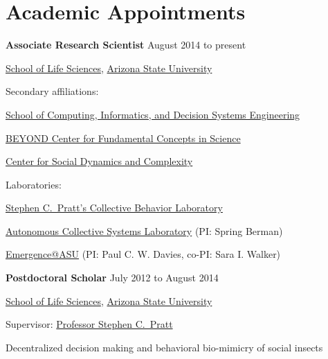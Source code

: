 \section{Academic Appointments}

\textbf{Associate Research Scientist} \hfill {August 2014 to present}
\begin{innerlist}

    \item[] \href{http://sols.asu.edu/}{School of Life Sciences},
            \href{http://www.asu.edu/}{Arizona State University}
    \begin{innerlist}
        \item Secondary affiliations:
            \begin{innerlist}
                \item \href{http://cidse.engineering.asu.edu/}{School of Computing, Informatics, and Decision Systems Engineering}
                \item \href{http://beyond.asu.edu/}{BEYOND Center for Fundamental Concepts in Science}
                \item \href{http://csdc.asu.edu/}{Center for Social Dynamics and Complexity}
            \end{innerlist}
        \item Laboratories:
            \begin{innerlist}
                \item \href{http://www.public.asu.edu/~spratt1}{Stephen C.~Pratt's Collective Behavior Laboratory}
                \item \href{http://faculty.engineering.asu.edu/acs/}{Autonomous Collective Systems Laboratory} (PI: Spring Berman)
                \item \href{http://emergence.asu.edu/}{Emergence@ASU} (PI: Paul C. W. Davies, co-PI: Sara I. Walker)
            \end{innerlist}
    \end{innerlist}

\end{innerlist}

\halfblankline

\textbf{Postdoctoral Scholar} \hfill {July 2012 to August 2014}
\begin{innerlist}

    \item[] \href{http://sols.asu.edu/}{School of Life Sciences},
            \href{http://www.asu.edu/}{Arizona State University}
    \begin{innerlist}
        \item Supervisor: \href{http://www.public.asu.edu/~spratt1}{Professor Stephen C.~Pratt}
        \item Decentralized decision making and behavioral bio-mimicry
            of social insects
    \end{innerlist}

\end{innerlist}

